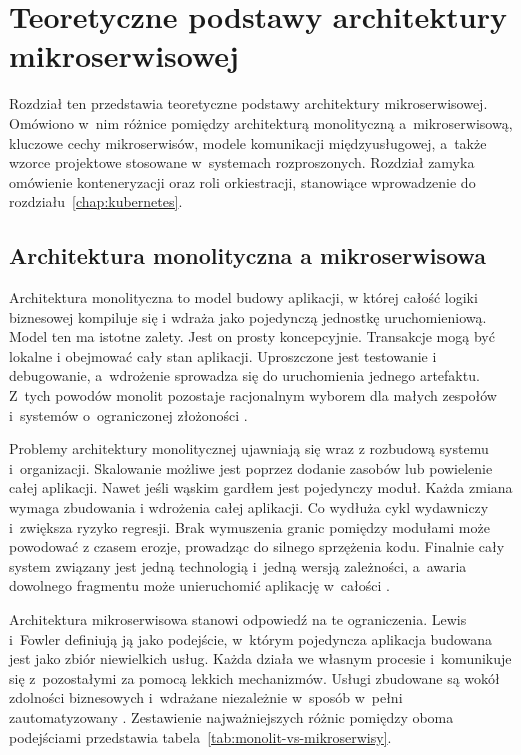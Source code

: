 \chapter{Teoretyczne podstawy architektury mikroserwisowej}
\label{chap:podstawy-mikroserwisow}

Rozdział ten przedstawia teoretyczne podstawy architektury mikroserwisowej. Omówiono w~nim różnice
pomiędzy architekturą monolityczną a~mikroserwisową, kluczowe cechy mikroserwisów, modele komunikacji międzyusługowej, a~także wzorce projektowe
stosowane w~systemach rozproszonych. Rozdział zamyka omówienie konteneryzacji oraz roli orkiestracji,
stanowiące wprowadzenie do rozdziału~\ref{chap:kubernetes}.

\section{Architektura monolityczna a mikroserwisowa}
\label{sec:monolit-a-mikroserwisy}

Architektura monolityczna to model budowy aplikacji, w której całość logiki biznesowej kompiluje się i wdraża jako
pojedynczą jednostkę uruchomieniową. Model ten ma istotne zalety. Jest on prosty koncepcyjnie. Transakcje mogą być
lokalne i obejmować cały stan aplikacji. Uproszczone jest testowanie i debugowanie, a~wdrożenie sprowadza się do uruchomienia 
jednego artefaktu. Z~tych powodów monolit pozostaje racjonalnym wyborem dla małych zespołów i~systemów 
o~ograniczonej złożoności \parencite{newman2021}.

Problemy architektury monolitycznej ujawniają się wraz z rozbudową systemu i~organizacji. Skalowanie możliwe
jest poprzez dodanie zasobów lub powielenie całej aplikacji. Nawet jeśli wąskim gardłem jest pojedynczy moduł.
Każda zmiana wymaga zbudowania i wdrożenia całej aplikacji. Co wydłuża cykl wydawniczy i~zwiększa ryzyko regresji.
Brak wymuszenia granic pomiędzy modułami może powodować z czasem erozje, prowadząc do silnego sprzężenia kodu.
Finalnie cały system związany jest jedną technologią i~jedną wersją zależności, a~awaria dowolnego fragmentu 
może unieruchomić aplikację w~całości \parencite{richardson2018}.

Architektura mikroserwisowa stanowi odpowiedź na te ograniczenia. Lewis i~Fowler definiują ją jako podejście,
w~którym pojedyncza aplikacja budowana jest jako zbiór niewielkich usług. Każda działa we własnym procesie
i~komunikuje się z~pozostałymi za pomocą lekkich mechanizmów. Usługi zbudowane są wokół zdolności biznesowych
i~wdrażane niezależnie w~sposób w~pełni zautomatyzowany \parencite{fowler2014}. Zestawienie najważniejszych różnic
pomiędzy oboma podejściami przedstawia tabela~\ref{tab:monolit-vs-mikroserwisy}.

